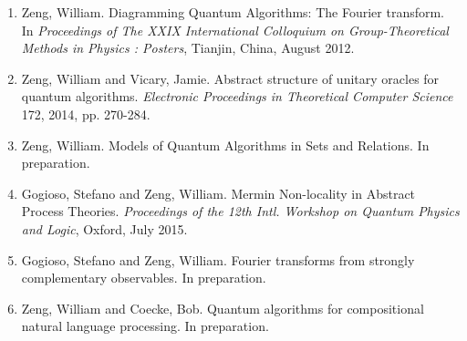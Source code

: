 \begin{enumerate}
\item Zeng, William. Diagramming Quantum Algorithms: The Fourier transform. In \emph{Proceedings of The XXIX International Colloquium on Group-Theoretical Methods in Physics
: Posters}, Tianjin, China, August 2012.
\item Zeng, William and Vicary, Jamie. Abstract structure of unitary oracles for quantum algorithms. \emph{Electronic Proceedings in Theoretical Computer Science} 172, 2014, pp. 270-284.
\item Zeng, William. Models of Quantum Algorithms in Sets and Relations. In preparation.
\item Gogioso, Stefano and Zeng, William. Mermin Non-locality in Abstract Process Theories. \emph{Proceedings of the 12th Intl. Workshop on Quantum Physics and Logic}, Oxford, July 2015.
\item Gogioso, Stefano and Zeng, William. Fourier transforms from strongly complementary observables. In preparation.
\item Zeng, William and Coecke, Bob. Quantum algorithms for compositional natural language processing. In preparation.
\end{enumerate}

